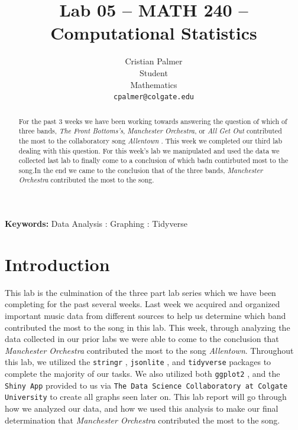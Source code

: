 \documentclass{article}\usepackage[]{graphicx}\usepackage[]{xcolor}
\begin{document}
\vspace{-1in}
\title{Lab 05 -- MATH 240 -- Computational Statistics}

\author{
  Cristian Palmer \\
  Student  \\
  Mathematics  \\
  {\tt cpalmer@colgate.edu}
}

\date{}

\maketitle

\begin{multicols}{2}
\begin{abstract}
For the past 3 weeks we have been working towards answering the question of which of three bands, \textit{The Front Bottoms's}, \textit{Manchester Orchestra}, or \textit{All Get Out} contributed the most to the collaboratory song \textit{Allentown} \citep{Song}. This week we completed our third lab dealing with this question. For this week's lab we manipulated and used the data we collected last lab to finally come to a conclusion of which badn contirbuted most to the song.In the end we came to the conclusion that of the three bands, \textit{Manchester Orchestra} contributed the most to the song.
\end{abstract}

\noindent \textbf{Keywords:} Data Analysis : Graphing : Tidyverse
\section{Introduction}
This lab is the culmination of the three part lab series which we have been completing for the past several weeks. Last week we acquired and organized important music data from different sources to help us determine which band contributed the most to the song in this lab. This week, through analyzing the data collected in our prior labs we were able to come to the conclusion that \textit{Manchester Orchestra} contributed the most to the song \textit{Allentown}. Throughout this lab, we utilized the \texttt{stringr} \citep{stringr}, \texttt{jsonlite} \citep{jsonlite}, and \texttt{tidyverse} \citep{tidyverse} packages to complete the majority of our tasks. We also utilized both \texttt{ggplot2} \citep{ggplot2}, and the \texttt{Shiny App} provided to us via \texttt{The Data Science Collaboratory at Colgate University} \citep{Shiny} to create all graphs seen later on. This lab report will go through how we analyzed our data, and how we used this analysis to make our final determination that \textit{Manchester Orchestra} contributed the most to the song.


\end{multicols}
\end{document}

